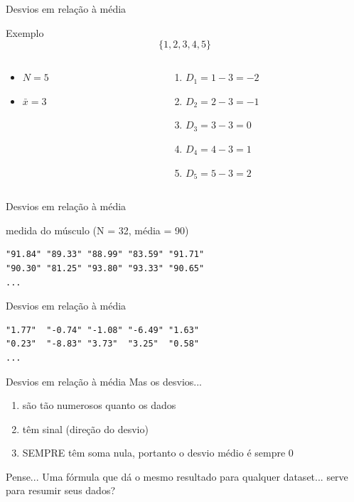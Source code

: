 \documentclass{beamer}
\begin{document}
\begin{frame}{Desvios em relação à média}
\begin{exampleblock}{Exemplo}
  \begin{displaymath}
    \{1,2,3,4,5\}
  \end{displaymath}

  \begin{columns}
    \begin{column}{5cm}
  \begin{itemize}
  \item $N=5$
  \item $\bar{x} = 3$
  \end{itemize}
\end{column}
\begin{column}{5cm}
  \begin{enumerate}
  \item $D_1 = 1-3 = -2$
  \item $D_2 = 2-3 = -1$
  \item $D_3 = 3-3 = 0$
  \item $D_4 = 4-3 = 1$
  \item $D_5 = 5-3 = 2$
  \end{enumerate}
\end{column}
\end{columns}
\end{exampleblock}
\end{frame}

\begin{frame}[fragile]{Desvios em relação à média}
  \begin{block}{medida do músculo (N = 32, média = 90)}
\begin{verbatim}
"91.84" "89.33" "88.99" "83.59" "91.71"
"90.30" "81.25" "93.80" "93.33" "90.65"
...
\end{verbatim}
  \end{block}
  \begin{block}{Desvios em relação à média}
\begin{verbatim}
"1.77"  "-0.74" "-1.08" "-6.49" "1.63"
"0.23"  "-8.83" "3.73"  "3.25"  "0.58"
...
\end{verbatim}
  \end{block}
\end{frame}

\begin{frame}{Desvios em relação à média}
  Mas os desvios...
  \begin{enumerate}
  \item são tão numerosos quanto os dados
  \item têm sinal (direção do desvio)
  \item SEMPRE têm soma \alert{nula}, portanto o desvio médio é sempre 0
  \end{enumerate}
  \begin{block}{Pense...}
    Uma fórmula que dá o mesmo resultado para qualquer dataset... serve para resumir seus dados?
  \end{block}
\end{frame}
\end{document}
